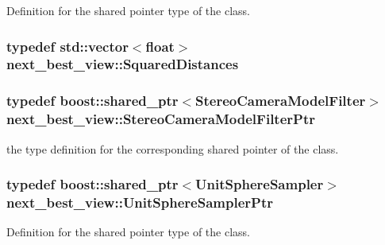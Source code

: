 \-Definition for the shared pointer type of the class. 

\hypertarget{namespacenext__best__view_aa80b6e9e4088f9660b210d1b3482513b}{
\subsubsection[{\-Squared\-Distances}]{\setlength{\rightskip}{0pt plus 5cm}typedef std\-::vector$<$float$>$ {\bf next\-\_\-best\-\_\-view\-::\-Squared\-Distances}}}\label{namespacenext__best__view_aa80b6e9e4088f9660b210d1b3482513b}
\hypertarget{namespacenext__best__view_aa4826bd6041da0bd02906ca80ec2d67a}{
\subsubsection[{\-Stereo\-Camera\-Model\-Filter\-Ptr}]{\setlength{\rightskip}{0pt plus 5cm}typedef boost\-::shared\-\_\-ptr$<${\bf \-Stereo\-Camera\-Model\-Filter}$>$ {\bf next\-\_\-best\-\_\-view\-::\-Stereo\-Camera\-Model\-Filter\-Ptr}}}\label{namespacenext__best__view_aa4826bd6041da0bd02906ca80ec2d67a}


the type definition for the corresponding shared pointer of the class. 

\hypertarget{namespacenext__best__view_ad3328c7d2bb2185c972df039061ad6f5}{
\subsubsection[{\-Unit\-Sphere\-Sampler\-Ptr}]{\setlength{\rightskip}{0pt plus 5cm}typedef boost\-::shared\-\_\-ptr$<${\bf \-Unit\-Sphere\-Sampler}$>$ {\bf next\-\_\-best\-\_\-view\-::\-Unit\-Sphere\-Sampler\-Ptr}}}\label{namespacenext__best__view_ad3328c7d2bb2185c972df039061ad6f5}


\-Definition for the shared pointer type of the class. 

